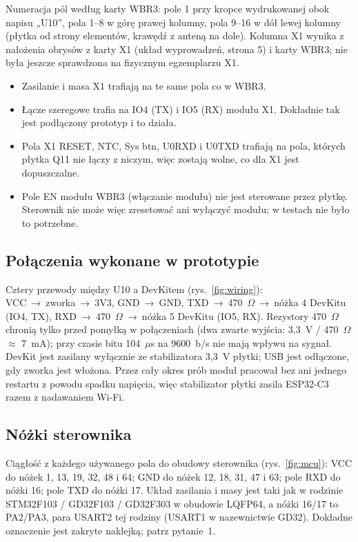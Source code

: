 \documentclass[11pt,a4paper]{article}
\newcommand{\ra}{{\symbolfont →}}
\begin{document}
Numeracja pól według karty WBR3: pole 1 przy kropce wydrukowanej obok napisu „U10”, pola 1--8 w górę prawej kolumny, pola 9--16 w dół lewej kolumny (płytka od strony elementów, krawędź z anteną na dole). Kolumna X1 wynika z nałożenia obrysów z karty X1 (układ wyprowadzeń, strona 5) i karty WBR3; nie była jeszcze sprawdzona na fizycznym egzemplarzu X1.

\begin{apbox}
\begin{itemize}
\item Zasilanie i masa X1 trafiają na te same pola co w WBR3.
\item Łącze szeregowe trafia na IO4 (TX) i IO5 (RX) modułu X1. Dokładnie tak jest podłączony prototyp i to działa.
\item Pola X1 RESET, NTC, Sys btn, U0RXD i U0TXD trafiają na pola, których płytka Q11 nie łączy z niczym, więc zostają wolne, co dla X1 jest dopuszczalne.
\item Pole EN modułu WBR3 (włączanie modułu) nie jest sterowane przez płytkę. Sterownik nie może więc zresetować ani wyłączyć modułu; w testach nie było to potrzebne.
\end{itemize}
\end{apbox}

\subsection{Połączenia wykonane w prototypie}

Cztery przewody między U10 a DevKitem (rys.~\ref{fig:wiring}): VCC~\ra~zworka~\ra~3V3, GND~\ra~GND, TXD~\ra~470~$\Omega$~\ra~nóżka 4 DevKitu (IO4, TX), RXD~\ra~470~$\Omega$~\ra~nóżka 5 DevKitu (IO5, RX). Rezystory 470~$\Omega$ chronią tylko przed pomyłką w połączeniach (dwa zwarte wyjścia: 3,3~V / 470~$\Omega$ $\approx$ 7~mA); przy czasie bitu 104~$\mu$s na 9600~b/s nie mają wpływu na sygnał. DevKit jest zasilany wyłącznie ze stabilizatora 3,3~V płytki; USB jest odłączone, gdy zworka jest włożona. Przez cały okres prób moduł pracował bez ani jednego restartu z powodu spadku napięcia, więc stabilizator płytki zasila ESP32-C3 razem z nadawaniem Wi-Fi.

\subsection{Nóżki sterownika}

Ciągłość z każdego używanego pola do obudowy sterownika (rys.~\ref{fig:mcu}): VCC do nóżek 1, 13, 19, 32, 48 i 64; GND do nóżek 12, 18, 31, 47 i 63; pole RXD do nóżki 16; pole TXD do nóżki 17. Układ zasilania i masy jest taki jak w rodzinie STM32F103 / GD32F103 / GD32F303 w obudowie LQFP64, a nóżki 16/17 to PA2/PA3, para USART2 tej rodziny (USART1 w nazewnictwie GD32). Dokładne oznaczenie jest zakryte naklejką; patrz pytanie~1.
\end{document}
